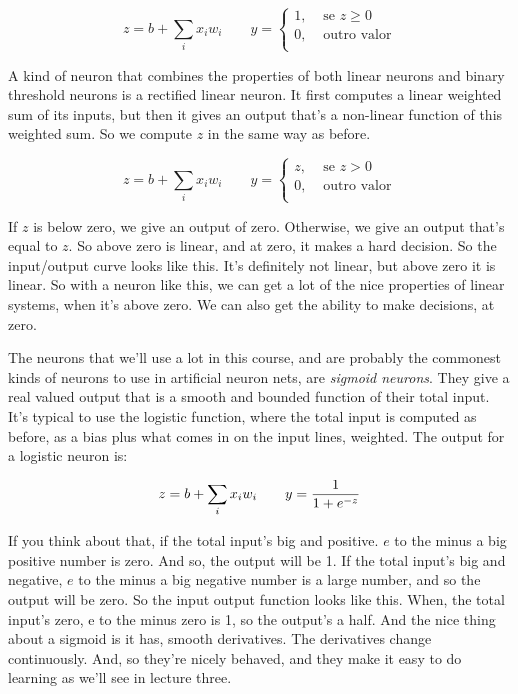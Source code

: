\begin{multicols}{2}
\begin{footnotesize}
\begin{equation}
z = b + \sum_i x_i w_i
\qquad
y = \left\{
    \begin{array}{ll}
    1, & \mbox{ se } z\geq0 \\
    0, & \mbox{ outro valor} \\
    \end{array}
    \right.
\label{eq:binary-threshold-formulation2}
\end{equation}


A kind of neuron that combines the properties of both linear neurons and binary threshold neurons is a rectified linear neuron. It first computes a linear weighted sum of its inputs, but then it gives an output that's a non-linear function of this weighted sum. So we compute $z$ in the same way as before.

\begin{equation}
z = b + \sum_i x_i w_i
\qquad
y = \left\{
    \begin{array}{ll}
    z, & \mbox{ se } z>0 \\
    0, & \mbox{ outro valor} \\
    \end{array}
    \right.
\label{eq:linear-treashold-neuron}
\end{equation}

If $z$ is below zero, we give an output of zero. Otherwise, we give an output that's equal to $z$. So above zero is linear, and at zero, it makes a hard decision. So the input/output curve looks like this. It's definitely not linear, but above zero it is linear. So with a neuron like this, we can get a lot of the nice properties of linear systems, when it's above zero. We can also get the ability to make decisions, at zero.

The neurons that we'll use a lot in this course, and are probably the commonest kinds of neurons to use in artificial neuron nets, are \emph{sigmoid neurons}. They give a real valued output that is a smooth and bounded function of their total input. It's typical to use the logistic function, where the total input is computed as before, as a bias plus what comes in on the input lines, weighted. The output for a logistic neuron is:

\begin{equation}
z = b + \sum_i x_i w_i
\qquad
y = {1 \over 1+e^{-z}}
\label{eq:sigmoid-neuron}
\end{equation}

If you think about that, if the total input's big and positive. $e$ to the minus a big positive number is zero. And so, the output will be 1. If the total input's big and negative, $e$ to the minus a big negative number is a large number, and so the output will be zero. So the input output function looks like this. When, the total input's zero, e to the minus zero is 1, so the output's a half. And the nice thing about a sigmoid is it has, smooth derivatives. The derivatives change continuously. And, so they're nicely behaved, and they make it easy to do learning as we'll see in lecture three.


\end{footnotesize}
\end{multicols}
